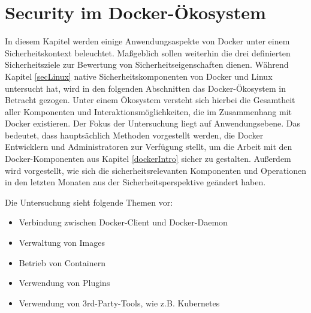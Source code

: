 \documentclass[../main.tex]{subfiles}
\begin{document}



\chapter{Security im Docker-Ökosystem}
\label{secEcosystem}
  In diesem Kapitel werden einige Anwendungsaspekte von Docker unter einem Sicherheitskontext beleuchtet. Maßgeblich sollen weiterhin die drei definierten Sicherheitsziele zur Bewertung von Sicherheitseigenschaften dienen. Während Kapitel \ref{secLinux} native Sicherheitskomponenten von Docker und Linux untersucht hat, wird in den folgenden Abschnitten das Docker-Ökosystem in Betracht gezogen. Unter einem Ökosystem versteht sich hierbei die Gesamtheit aller Komponenten und Interaktionsmöglichkeiten, die im Zusammenhang mit Docker existieren. Der Fokus der Untersuchung liegt auf Anwendungsebene. Das bedeutet, dass hauptsächlich Methoden vorgestellt werden, die Docker Entwicklern und Administratoren zur Verfügung stellt, um die Arbeit mit den Docker-Komponenten aus Kapitel \ref{dockerIntro} sicher zu gestalten. Außerdem wird vorgestellt, wie sich die sicherheitsrelevanten Komponenten und Operationen in den letzten Monaten aus der Sicherheitsperspektive geändert haben.

  Die Untersuchung sieht folgende Themen vor:

  \begin{itemize}
    \item Verbindung zwischen Docker-Client und Docker-Daemon
    \item Verwaltung von Images
    \item Betrieb von Containern
    \item Verwendung von Plugins
    \item Verwendung von 3rd-Party-Tools, wie z.B. Kubernetes
  \end{itemize}

\end{document}
